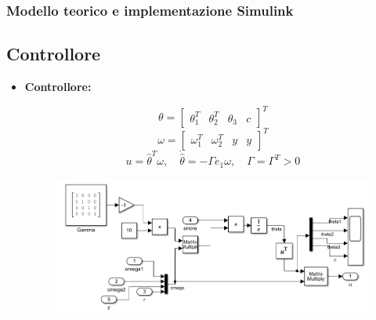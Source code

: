 \documentclass{beamer}
\begin{document}
\begin{frame}
	\frametitle{Modello teorico e implementazione Simulink}
    \subsection{Controllore}
	\begin{itemize}
        \item \textbf{Controllore:}
        \begin{minipage}[t]{0.45\textwidth}
            \begin{equation}
                \theta=\begin{bmatrix}
                    \theta_{1}^{T}&\theta_{2}^{T}&\theta_{3}&c
                \end{bmatrix}^{T}
            \end{equation}
            \begin{equation}
                \omega=\begin{bmatrix}
                    \omega_{1}^{T}&\omega_{2}^T&y&y
                \end{bmatrix}^{T}
            \end{equation}\begin{equation}
                u=\hat{\theta}^T\omega,\quad \dot{\hat{\theta}}=-\Gamma e_{1}\omega,\quad \Gamma=\Gamma^{T}>0
            \end{equation}
        \end{minipage}
        \begin{minipage}[t]{0.45\textwidth}
            \begin{figure}
                \centering
                \includegraphics[scale=0.4]{2022-05-28-14-51-50.png}%
            \end{figure}
        \end{minipage}
    \end{itemize}
\end{frame}
\end{document}
